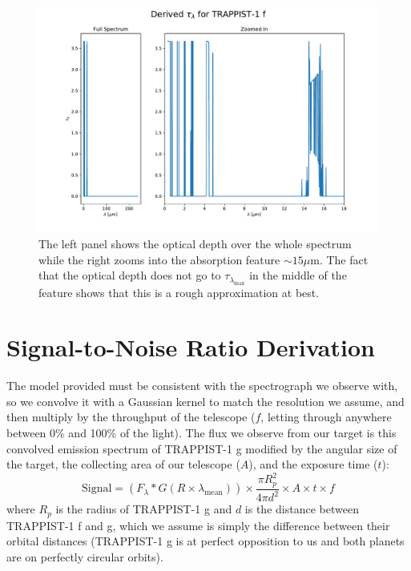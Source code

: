 \documentclass{knac}
\begin{document}
\begin{figure}[bht]
\centering
\includegraphics[angle=0,scale=0.4]{tau_lambda.pdf}
\caption{The left panel shows the optical depth over the whole spectrum while the right zooms into the absorption feature $\sim 15 \mu$m. The fact that the optical depth does not go to $\tau_{\lambda_{\mathrm{max}}}$ in the middle of the feature shows that this is a rough approximation at best.}
\label{figure:tau}
\end{figure}

\section{Signal-to-Noise Ratio Derivation}
The model provided must be consistent with the spectrograph we observe with, so we convolve it with a Gaussian kernel to match the resolution we assume, and then multiply by the throughput of the telescope ($f$, letting through anywhere between 0\% and 100\% of the light). The flux we observe from our target is this convolved emission spectrum of TRAPPIST-1 g modified by the angular size of the target, the collecting area of our telescope ($A$), and the exposure time ($t$):
\begin{equation}
\mathrm{Signal} = \left(F_\lambda * G(R\times \lambda_\mathrm{mean})\right) \times \frac{\pi R_p^2}{4\pi d^2} \times A \times t \times f
\end{equation} where $R_p$ is the radius of TRAPPIST-1 g and $d$ is the distance between TRAPPIST-1 f and g, which we assume is simply the difference between their orbital distances (TRAPPIST-1 g is at perfect opposition to us and both planets are on perfectly circular orbits).
\end{document}
